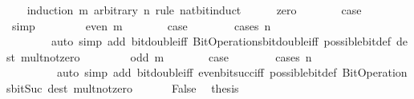 \begin{isabellebody}
\ \ \isamarkupfalse%
\ {\isacharparenleft}{\kern0pt}induction\ m\ arbitrary{\isacharcolon}{\kern0pt}\ n\ rule{\isacharcolon}{\kern0pt}\ nat{\isacharunderscore}{\kern0pt}bit{\isacharunderscore}{\kern0pt}induct{\isacharparenright}{\kern0pt}\isanewline
\ \ \ \ \isamarkupfalse%
\ zero\isanewline
\ \ \ \ \isamarkupfalse%
\ \isamarkupfalse%
\ {\isacharquery}{\kern0pt}case\isanewline
\ \ \ \ \ \ \isamarkupfalse%
\ simp\isanewline
\ \ \isamarkupfalse%
\isanewline
\ \ \ \ \isamarkupfalse%
\ {\isacharparenleft}{\kern0pt}even\ m{\isacharparenright}{\kern0pt}\isanewline
\ \ \ \ \isamarkupfalse%
\ \isamarkupfalse%
\ {\isacharquery}{\kern0pt}case\isanewline
\ \ \ \ \ \ \isamarkupfalse%
\ {\isacharparenleft}{\kern0pt}cases\ n{\isacharparenright}{\kern0pt}\isanewline
\ \ \ \ \ \ \ \ {\isacharparenleft}{\kern0pt}auto\ simp\ add{\isacharcolon}{\kern0pt}\ bit{\isacharunderscore}{\kern0pt}double{\isacharunderscore}{\kern0pt}iff\ Bit{\isacharunderscore}{\kern0pt}Operations{\isachardot}{\kern0pt}bit{\isacharunderscore}{\kern0pt}double{\isacharunderscore}{\kern0pt}iff\ possible{\isacharunderscore}{\kern0pt}bit{\isacharunderscore}{\kern0pt}def\ dest{\isacharcolon}{\kern0pt}\ mult{\isacharunderscore}{\kern0pt}not{\isacharunderscore}{\kern0pt}zero{\isacharparenright}{\kern0pt}\isanewline
\ \ \isamarkupfalse%
\isanewline
\ \ \ \ \isamarkupfalse%
\ {\isacharparenleft}{\kern0pt}odd\ m{\isacharparenright}{\kern0pt}\isanewline
\ \ \ \ \isamarkupfalse%
\ \isamarkupfalse%
\ {\isacharquery}{\kern0pt}case\isanewline
\ \ \ \ \ \ \isamarkupfalse%
\ {\isacharparenleft}{\kern0pt}cases\ n{\isacharparenright}{\kern0pt}\isanewline
\ \ \ \ \ \ \ \ \ {\isacharparenleft}{\kern0pt}auto\ simp\ add{\isacharcolon}{\kern0pt}\ bit{\isacharunderscore}{\kern0pt}double{\isacharunderscore}{\kern0pt}iff\ even{\isacharunderscore}{\kern0pt}bit{\isacharunderscore}{\kern0pt}succ{\isacharunderscore}{\kern0pt}iff\ possible{\isacharunderscore}{\kern0pt}bit{\isacharunderscore}{\kern0pt}def\ Bit{\isacharunderscore}{\kern0pt}Operations{\isachardot}{\kern0pt}bit{\isacharunderscore}{\kern0pt}Suc\ dest{\isacharcolon}{\kern0pt}\ mult{\isacharunderscore}{\kern0pt}not{\isacharunderscore}{\kern0pt}zero{\isacharparenright}{\kern0pt}\isanewline
\ \ \isamarkupfalse%
\isanewline
\ \ \isamarkupfalse%
\ False\ \isamarkupfalse%
\ {\isacharquery}{\kern0pt}thesis\isanewline

\end{isabellebody}

